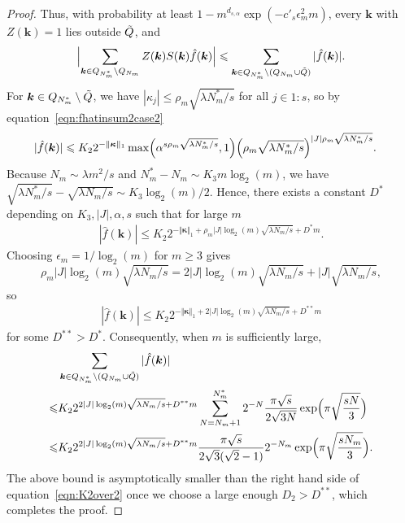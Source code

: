 \documentclass{article}
\theoremstyle{definition}
\renewcommand{\le}{\leqslant}
\renewcommand{\leq}{\leqslant}
\renewcommand{\geq}{\geqslant}
\newcommand{\bsk}{\boldsymbol{k}}
\newcommand{\bskappa}{\boldsymbol{\kappa}}
\begin{document}
\begin{proof}
Thus, with probability at least $1-m^{d_{s,\alpha}} \exp(-c'_s \epsilon_m^2 m)$, every $\bsk$ with $Z(\bsk)=1$ lies outside $\Tilde{Q}$, and
\begin{equation}\label{eqn:removebadk}
    \Bigl|\sum_{\bsk\in Q_{N^*_m}\setminus Q_{N_m} } Z(\bsk)S(\bsk)\hat{f}(\bsk)\Bigr|\leq \sum_{\bsk\in Q_{N^*_m}\setminus(Q_{N_m}\cup\Tilde{Q}) } |\hat{f}(\bsk)|.
\end{equation}
For $\bsk\in  Q_{N^*_m}\setminus\Tilde{Q}$, we have $|\kappa_j|\leq \rho_m \sqrt{\lambda N^*_m/s}$ for all $j\in 1{:}s$, so by equation~\eqref{eqn:fhatinsum2case2}
\begin{align*}
   |\hat{f}(\bsk)|&\le K_2 2^{-\Vert\bskappa\Vert_1}\max\Bigl(\alpha^{s\rho_m \sqrt{\lambda N^*_m/s}},1\Bigr)\Big(\rho_m \sqrt{\lambda N^*_m/s}\Big)^{|J|\rho_m \sqrt{\lambda N^*_m/s}}.
\end{align*}
Because $N_m\sim \lambda m^2/s$ and $N^*_m-N_m\sim K_3m\log_2(m)$, we have $\sqrt{\lambda N^*_m/s}-\sqrt{\lambda N_m/s}\sim K_3\log_2(m)/2  $. Hence, there exists a constant $D^*$ depending on $K_3, |J|,\alpha,s$ such that for large $m$
\begin{align*}
   |\hat{f}(\bsk)|\le K_2 2^{-\Vert\bskappa\Vert_1+ \rho_m|J|  \log_2(m)\sqrt{\lambda N_m/s}+D^* m}.
\end{align*}
Choosing $\epsilon_m=1/\log_2(m)$ for $m\geq 3$ gives
$$\rho_m |J| \log_2(m)\sqrt{\lambda N_m/s}=2 |J| \log_2(m)\sqrt{\lambda N_m/s}+|J|\sqrt{\lambda N_m/s},$$
so
\begin{align}\label{eqn:fkboundoneL}
   |\hat{f}(\bsk)|\le K_2 2^{-\Vert\bskappa\Vert_1+2 |J| \log_2(m)\sqrt{\lambda N_m/s}+D^{**} m}
\end{align}
for some $D^{**} > D^*$. Consequently, when $m$ is sufficiently large,
\begin{align}\label{eqn:sum2case2}
    &\sum_{\bsk\in Q_{N^*_m}\setminus(Q_{N_m}\cup\Tilde{Q}) } |\hat{f}(\bsk)|\\
    \leq&K_2 2^{2|J| \log_2(m)\sqrt{\lambda N_m/s}+D^{**} m}\sum_{N=N_m+1}^{N^*_m} 2^{-N}\frac{\pi \sqrt{s}}{2\sqrt{3N}}\exp\Bigl(\pi\sqrt{\frac{sN}{3}}\Bigr)\nonumber\\
    \leq &K_2 2^{2 |J| \log_2(m)\sqrt{\lambda N_m/s}+D^{**} m}\frac{\pi \sqrt{s}}{2\sqrt{3}(\sqrt{2}-1)}2^{-N_m}\exp\Bigl(\pi\sqrt{\frac{sN_m}{3}}\Bigr). \nonumber
\end{align}
The above bound is asymptotically smaller than the right hand side of equation~\eqref{eqn:K2over2} once we choose a large enough $D_2>D^{**}$, which completes the proof.
\end{proof}
\end{document}
